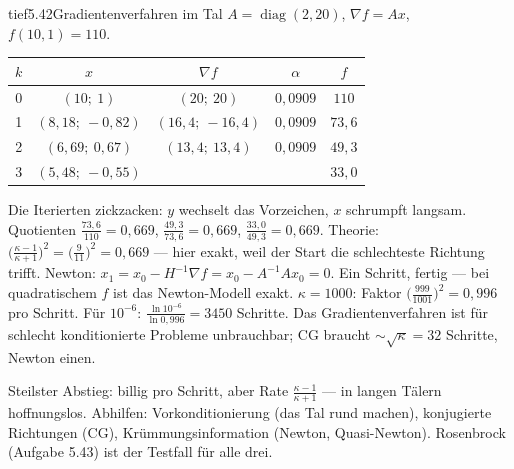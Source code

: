 \begin{loesungkarte}{tief}{5.42}{Gradientenverfahren im Tal}
$A = \operatorname{diag}(2, 20)$, $\nabla f = Ax$, $f(10, 1) = 110$.
\begin{center}\small
\begin{tabular}{c|ccc|c}
$k$ & $x$ & $\nabla f$ & $\alpha$ & $f$\\ \hline
0 & $(10;\ 1)$ & $(20;\ 20)$ & $0{,}0909$ & $110$\\
1 & $(8{,}18;\ -0{,}82)$ & $(16{,}4;\ -16{,}4)$ & $0{,}0909$ & $73{,}6$\\
2 & $(6{,}69;\ 0{,}67)$ & $(13{,}4;\ 13{,}4)$ & $0{,}0909$ & $49{,}3$\\
3 & $(5{,}48;\ -0{,}55)$ & & & $33{,}0$
\end{tabular}
\end{center}
Die Iterierten zickzacken: $y$ wechselt das Vorzeichen, $x$ schrumpft langsam.
Quotienten $\frac{73{,}6}{110} = 0{,}669$, $\frac{49{,}3}{73{,}6} = 0{,}669$, $\frac{33{,}0}{49{,}3} = 0{,}669$. Theorie: $\bigl(\frac{\kappa - 1}{\kappa + 1}\bigr)^{2} = \bigl(\frac9{11}\bigr)^{2} = 0{,}669$ --- hier exakt, weil der Start die schlechteste Richtung trifft.
Newton: $x_1 = x_0 - H^{-1}\nabla f = x_0 - A^{-1}Ax_0 = 0$. Ein Schritt, fertig --- bei quadratischem $f$ ist das Newton-Modell exakt.
$\kappa = 1000$: Faktor $\bigl(\frac{999}{1001}\bigr)^{2} = 0{,}996$ pro Schritt. Für $10^{-6}$: $\frac{\ln10^{-6}}{\ln0{,}996} = 3450$ Schritte. Das Gradientenverfahren ist für schlecht konditionierte Probleme unbrauchbar; CG braucht $\sim\sqrt\kappa = 32$ Schritte, Newton einen.
\begin{mitnehmen}\kastentext
Steilster Abstieg: billig pro Schritt, aber Rate $\frac{\kappa - 1}{\kappa + 1}$ --- in langen Tälern hoffnungslos. Abhilfen: Vorkonditionierung (das Tal rund machen), konjugierte Richtungen (CG), Krümmungsinformation (Newton, Quasi-Newton). Rosenbrock (Aufgabe 5.43) ist der Testfall für alle drei.
\end{mitnehmen}
\end{loesungkarte}

